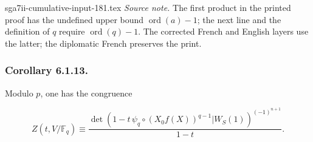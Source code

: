\begin{filecontents*}{sga7ii-cumulative-input-181.tex}
\medskip
\noindent\emph{Source note.}
The first product in the printed proof has the undefined upper bound
$\operatorname{ord}(a)-1$; the next line and the definition of $q$ require
$\operatorname{ord}(q)-1$.  The corrected French and English layers use
the latter; the diplomatic French preserves the print.

\subsubsection*{Corollary 6.1.13.}
Modulo $p$, one has the congruence

\begin{equation*}
Z(t,V/\mathbb F_q)
\equiv
\frac{
\det\!\left(
1-t\,\psi_q\circ(X_0f(X))^{q-1}
\mathrel{\Big|}W_S(1)
\right)^{(-1)^{n+1}}
}{1-t}.
\end{equation*}

\end{filecontents*}
